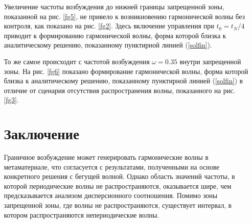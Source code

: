 Увеличение частоты возбуждения до нижней границы запрещенной зоны, показанной на рис. \ref{fg5}, не привело к возникновению гармонической волны без контроля, как показано на рис. \ref{fg2}. Здесь включение управления при $ t_0 = t_N / 4 $ приводит к формированию гармонической волны, форма которой близка к аналитическому решению, показанному пунктирной линией (\ref {solfin}).

То же самое происходит с частотой возбуждения $\omega = 0.35 $ внутри запрещенной зоны. На рис. \ref {fg6} показано формирование гармонической волны, форма которой близка к аналитическому решению, показанному пунктирной линией (\ref {solfin}) в отличие от сценария отсутствия распространения волны, показанного на рис. \ref {fg3}.


\section{Заключение}

Граничное возбуждение может генерировать гармонические волны в метаматериале, что согласуется с результатами, полученными на основе конкретного решения с бегущей волной. Однако область значений частоты, в которой периодические волны не распространяются, оказывается шире, чем предсказывается анализом дисперсионного соотношения. Помимо зоны запрещенной зоны, где волны не распространяются, существует интервал, в котором распространяются непериодические волны.

